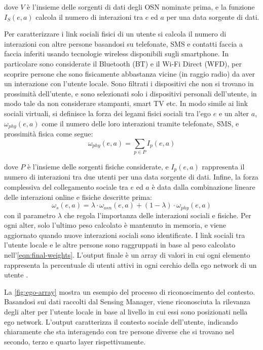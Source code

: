 \documentclass[12pt,italian]{report}
\begin{document}
dove $V$ è l'insieme delle sorgenti di dati degli OSN nominate prima, e la funzione $I_S (e, a)$ calcola il numero di interazioni tra $e$ ed $a$ per una data sorgente di dati. 

Per caratterizzare i link sociali fisici di un utente si calcola il numero di interazioni con altre persone basandosi su telefonate, SMS e contatti faccia a faccia inferiti usando tecnologie wireless disponibili sugli smartphone. In particolare sono considerate il Bluetooth (BT) e il Wi-Fi Direct (WFD), per scoprire persone che sono fisicamente abbastanza vicine (in raggio radio) da aver un interazione con l'utente locale. Sono filtrati i dispositivi che non si trovano in prossimità dell'utente, e sono selezionati solo i dispositivi personali dell'utente, in modo tale da non considerare stampanti, smart TV etc. In modo simile ai link sociali virtuali, si definisce la forza dei legami fisici sociali tra l'ego $e$ e un alter $a$, $\omega_{phy}(e, a)$ come il numero delle loro interazioni tramite telefonate, SMS, e prossimità fisica come segue:
\begin{equation}
	\omega_{phy}(e, a) = \sum_{p \in P}I_p(e,a)
\end{equation}

\noindent dove $P$ è l'insieme delle sorgenti fisiche considerate, e $I_p(e,a)$ rappresenta il numero di interazioni tra due utenti per una data sorgente di dati. Infine, la forza complessiva del collegamento sociale tra $e$ ed $a$ è data dalla combinazione lineare delle interazioni online e fisiche descritte prima:
\begin{equation}
\label{eqn:final-weights}
	\omega_s(e,a) = \lambda \cdot \omega_{osn}(e,a) + (1 - \lambda)
	\cdot \omega_{phy}(e,a)
\end{equation}
con il parametro $\lambda$ che regola l'importanza delle interazioni sociali e fisiche. Per ogni alter, solo l'ultimo peso calcolato è mantenuto in memoria, e viene aggiornato quando nuove interazioni sociali sono identificate. I link sociali tra l'utente locale e le altre persone sono raggruppati in base al peso calcolato nell'\autoref{eqn:final-weights}. L'output finale è un array di valori in cui ogni elemento rappresenta la percentuale di utenti attivi in ogni cerchio della ego network di un utente \cite{ego-net}. 

La \autoref{fig:ego-array} mostra un esempio del processo di riconoscimento del contesto. Basandosi sui dati raccolti dal Sensing Manager, viene riconosciuta la rilevanza degli alter per l'utente locale in base al livello in cui essi sono posizionati nella ego network. L'output caratterizza il contesto sociale dell'utente, indicando chiaramente che sta interagendo con tre persone diverse che si trovano nel secondo, terzo e quarto layer rispettivamente.
\end{document}
